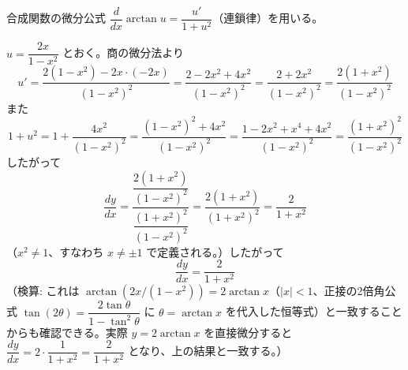 
合成関数の微分公式 $\dfrac{d}{dx}\arctan u = \dfrac{u'}{1+u^{2}}$（連鎖律）を用いる。

$u = \dfrac{2x}{1-x^{2}}$ とおく。商の微分法より
\[
u' = \frac{2(1-x^{2}) - 2x\cdot(-2x)}{(1-x^{2})^{2}}
= \frac{2 - 2x^{2} + 4x^{2}}{(1-x^{2})^{2}}
= \frac{2 + 2x^{2}}{(1-x^{2})^{2}}
= \frac{2(1+x^{2})}{(1-x^{2})^{2}}
\]
また
\[
1 + u^{2} = 1 + \frac{4x^{2}}{(1-x^{2})^{2}}
= \frac{(1-x^{2})^{2} + 4x^{2}}{(1-x^{2})^{2}}
= \frac{1 - 2x^{2} + x^{4} + 4x^{2}}{(1-x^{2})^{2}}
= \frac{(1+x^{2})^{2}}{(1-x^{2})^{2}}
\]
したがって
\[
\frac{dy}{dx} = \frac{\dfrac{2(1+x^{2})}{(1-x^{2})^{2}}}{\dfrac{(1+x^{2})^{2}}{(1-x^{2})^{2}}}
= \frac{2(1+x^{2})}{(1+x^{2})^{2}}
= \frac{2}{1+x^{2}}
\]
（$x^{2} \neq 1$、すなわち $x \neq \pm 1$ で定義される。）したがって
\[
\boxed{\; \frac{dy}{dx} = \frac{2}{1+x^{2}} \;}
\]
（検算: これは $\arctan(2x/(1-x^{2})) = 2\arctan x$（$|x|<1$、正接の2倍角公式 $\tan(2\theta) = \dfrac{2\tan\theta}{1-\tan^{2}\theta}$ に $\theta=\arctan x$ を代入した恒等式）と一致することからも確認できる。実際 $y=2\arctan x$ を直接微分すると $\dfrac{dy}{dx} = 2\cdot\dfrac{1}{1+x^{2}} = \dfrac{2}{1+x^{2}}$ となり、上の結果と一致する。）
